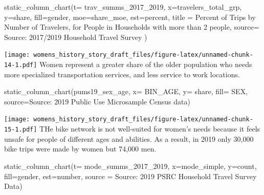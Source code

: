 \documentclass[
  12pt,
]{article}
\newenvironment{Shaded}{\begin{snugshade}}{\end{snugshade}}
\newcommand{\AttributeTok}[1]{\textcolor[rgb]{0.77,0.63,0.00}{#1}}
\newcommand{\FunctionTok}[1]{\textcolor[rgb]{0.00,0.00,0.00}{#1}}
\newcommand{\NormalTok}[1]{#1}
\newcommand{\StringTok}[1]{\textcolor[rgb]{0.31,0.60,0.02}{#1}}
\begin{document}
\begin{flushleft}
\begin{Shaded}
\begin{Highlighting}[]
\FunctionTok{static\_column\_chart}\NormalTok{(}\AttributeTok{t=}\NormalTok{ trav\_summs\_2017\_2019, }\AttributeTok{x=}\StringTok{\textquotesingle{}travelers\_total\_grp\textquotesingle{}}\NormalTok{, }\AttributeTok{y=}\StringTok{\textquotesingle{}share\textquotesingle{}}\NormalTok{,  }\AttributeTok{fill=}\StringTok{\textquotesingle{}gender\textquotesingle{}}\NormalTok{, }\AttributeTok{moe=}\StringTok{\textquotesingle{}share\_moe\textquotesingle{}}\NormalTok{, }\AttributeTok{est=}\StringTok{\textquotesingle{}percent\textquotesingle{}}\NormalTok{, }\AttributeTok{title =} \StringTok{\textquotesingle{}Percent of Trips by Number of Travelers, for People in Households with more than 2 people\textquotesingle{}}\NormalTok{,  }\AttributeTok{source=} \StringTok{\textquotesingle{}Source: 2017/2019 Household Travel Survey\textquotesingle{}}\NormalTok{ )}
\end{Highlighting}
\end{Shaded}

\texttt{[image: womens\_history\_story\_draft\_files/figure-latex/unnamed-chunk-14-1.pdf]}
Women represent a greater share of the older population who needs more
specialized transportation services, and less service to work locations.

\begin{Shaded}
\begin{Highlighting}[]
\FunctionTok{static\_column\_chart}\NormalTok{(pums19\_sex\_age, }\AttributeTok{x=} \StringTok{\textquotesingle{}BIN\_AGE\textquotesingle{}}\NormalTok{, }\AttributeTok{y=} \StringTok{\textquotesingle{}share\textquotesingle{}}\NormalTok{, }\AttributeTok{fill=} \StringTok{\textquotesingle{}SEX\textquotesingle{}}\NormalTok{, }\AttributeTok{source=}\StringTok{\textquotesingle{}Source: 2019 Public Use Microsample Census data\textquotesingle{}}\NormalTok{)}
\end{Highlighting}
\end{Shaded}

\texttt{[image: womens\_history\_story\_draft\_files/figure-latex/unnamed-chunk-15-1.pdf]}
THe bike network is not well-suited for women's needs because it feels
unsafe for people of different ages and abilities. As a result, in 2019
only 30,000 bike trips were made by women but 74,000 men.

\begin{Shaded}
\begin{Highlighting}[]
\FunctionTok{static\_column\_chart}\NormalTok{(}\AttributeTok{t=}\NormalTok{ mode\_summs\_2017\_2019, }\AttributeTok{x=}\StringTok{\textquotesingle{}mode\_simple\textquotesingle{}}\NormalTok{, }\AttributeTok{y=}\StringTok{\textquotesingle{}count\textquotesingle{}}\NormalTok{,  }\AttributeTok{fill=}\StringTok{\textquotesingle{}gender\textquotesingle{}}\NormalTok{, }\AttributeTok{est=}\StringTok{\textquotesingle{}number\textquotesingle{}}\NormalTok{, }\AttributeTok{source =} \StringTok{\textquotesingle{}Source: 2019 PSRC Household Travel Survey Data\textquotesingle{}}\NormalTok{)}
\end{Highlighting}
\end{Shaded}


\end{flushleft}
\end{document}
